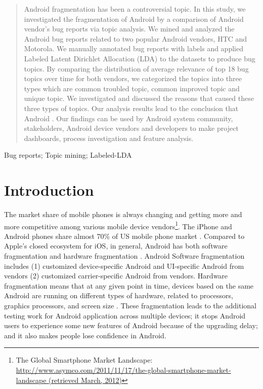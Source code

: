 \documentclass[10pt, conference, compsocconf]{IEEEtran}
\begin{document}
\begin{abstract}
Android fragmentation has been a controversial topic. In this study, we investigated the fragmentation of Android by a comparison of Android vendor's bug reports via topic analysis. We mined and analyzed the Android bug reports related to two popular Android vendors, HTC and Motorola. We manually annotated bug reports with labels and applied Labeled Latent Dirichlet Allocation (LDA) to the datasets to produce bug topics. By comparing the distribution of average relevance of top 18 bug topics over time for both vendors, we categorized the topics into three types which are common troubled topic, common improved topic and unique topic. We investigated and discussed the reasons that caused these three types of topics. Our analysis results lead to the conclusion that Android . Our findings can be used by Android system community, stakeholders, Android device vendors and developers to make project dashboards, process investigation and feature analysis.

\end{abstract}

\begin{IEEEkeywords}
Bug reports; Topic mining; Labeled-LDA
\end{IEEEkeywords}


%
\IEEEpeerreviewmaketitle



\section{Introduction}

The market share of mobile phones is always changing and getting more and more competitive among various mobile device vendors\footnote{The Global Smartphone Market Landscape: \url{http://www.asymco.com/2011/11/17/the-global-smartphone-market-landscape (retrieved March, 2012)}}. The iPhone and Android phones share almost 70\% of US mobile phone market \cite{usmarket}. Compared to Apple’s closed ecosystem for iOS, in general, Android has both software fragmentation and hardware fragmentation \cite{analysis}. Android Software fragmentation includes (1) customized device-specific Android and UI-specific Android from vendors (2) customized carrier-specific  Android from vendors. Hardware fragmentation means that at any given point in time, devices based on the same Android are running on different types of hardware, related to processors, graphics processors, and screen size \cite{analysis}. These fragmentation leads to the additional testing work for Android application across multiple devices; it stops Android users to experience some new features of Android because of the upgrading delay; and it also makes people lose confidence in Android.  
\end{document}
